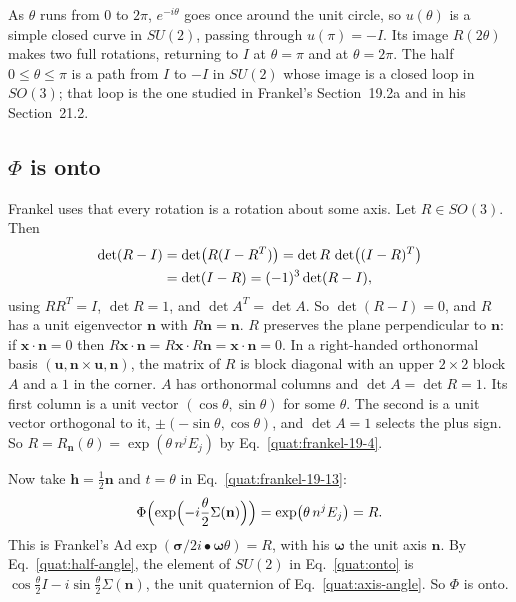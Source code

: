 As $\theta$ runs from $0$ to $2\pi$, $e^{-i\theta}$ goes once around the unit
circle, so $u(\theta)$ is a simple closed curve in $SU(2)$, passing through
$u(\pi)=-I$. Its image $R(2\theta)$ makes two full rotations, returning to
$I$ at $\theta=\pi$ and at $\theta=2\pi$. The half $0\le\theta\le\pi$ is a
path from $I$ to $-I$ in $SU(2)$ whose image is a closed loop in $SO(3)$; that
loop is the one studied in Frankel's Section~19.2a and in his
Section~21.2.

\subsection{\texorpdfstring{$\Phi$}{Phi} is onto}
Frankel uses that every rotation is a rotation about some axis. Let
$R\in SO(3)$. Then
\begin{align}
 \det(R-I)&=\det\bigl(R(I-R^T)\bigr)=\det R\,\det\bigl((I-R)^T\bigr)\notag\\
 &=\det(I-R)=(-1)^3\det(R-I),
\end{align}
using $RR^T=I$, $\det R=1$, and $\det A^T=\det A$. So $\det(R-I)=0$, and $R$
has a unit eigenvector $\mathbf n$ with $R\mathbf n=\mathbf n$. $R$ preserves
the plane perpendicular to $\mathbf n$: if $\mathbf x\cdot\mathbf n=0$ then
$R\mathbf x\cdot\mathbf n=R\mathbf x\cdot R\mathbf n=\mathbf x\cdot\mathbf n=0$.
In a right-handed orthonormal basis $(\mathbf u,\mathbf n\times\mathbf u,
\mathbf n)$, the matrix of $R$ is block diagonal with an upper $2\times2$
block $A$ and a $1$ in the corner. $A$ has orthonormal columns and
$\det A=\det R=1$. Its first column is a unit vector
$(\cos\theta,\sin\theta)$ for some $\theta$. The second is a unit vector
orthogonal to it, $\pm(-\sin\theta,\cos\theta)$, and $\det A=1$ selects the
plus sign. So $R=R_{\mathbf n}(\theta)=\exp(\theta\,n^jE_j)$ by
Eq.~\eqref{quat:frankel-19-4}.

Now take $\mathbf h=\frac12\mathbf n$ and $t=\theta$ in
Eq.~\eqref{quat:frankel-19-13}:
\begin{equation}\label{quat:onto}
 \Phi\Bigl(\exp\Bigl(-i\frac{\theta}{2}\Sigma(\mathbf n)\Bigr)\Bigr)
 =\exp\bigl(\theta\,n^jE_j\bigr)=R .
\end{equation}
This is Frankel's $\mathrm{Ad}\exp(\boldsymbol\sigma/2i\bullet\boldsymbol\omega
\theta)=R$, with his $\boldsymbol\omega$ the unit axis $\mathbf n$. By
Eq.~\eqref{quat:half-angle}, the element of $SU(2)$ in Eq.~\eqref{quat:onto}
is $\cos\frac{\theta}{2}I-i\sin\frac{\theta}{2}\Sigma(\mathbf n)$, the unit
quaternion of Eq.~\eqref{quat:axis-angle}. So $\Phi$ is onto.

